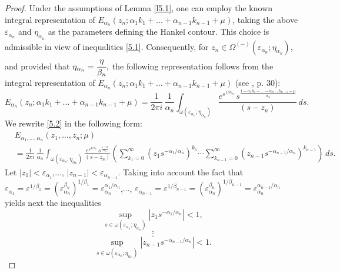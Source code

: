 \documentclass[12pt, reqno]{amsart}
\theoremstyle{definition}
\theoremstyle{remark}
\numberwithin{equation}{section}
\begin{document}
\begin{proof}
Under the assumptions of Lemma \ref{l5.1}, one can employ the known integral representation of
$E_{\alpha_n}\left(z_n;\alpha_1 k_1+...+\alpha_{n-1}k_{n-1}+\mu\right)$, taking the above
$\varepsilon_{\alpha_n}$ and $\eta_{\alpha_n}$ as the parameters defining the Hankel contour.
This choice is admissible in view of inequalities \eqref{5.1}. Consequently, for
$
z_n\in\Omega^{(-)}(\varepsilon_{\alpha_n};\eta_{\alpha_n}),
$
and provided that
$
\eta_{\alpha_n}=\cfrac{\eta}{\beta_n},
$
the following representation follows from the integral representation of
$E_{\alpha_n}(z_n;\alpha_1k_1+\dots+\alpha_{n-1}k_{n-1}+\mu)$ (see \cite{Podlubny}, p. 30):
$$
E_{\alpha_n}(z_n;\alpha_1k_1+\dots+\alpha_{n-1}k_{n-1}+\mu)
=
\frac{1}{2\pi i}\,
\frac{1}{\alpha_n}
\int_{\omega(\varepsilon_{\alpha_n};\eta_{\alpha_n})}
\frac{
e^{s^{1/\alpha_n}}
\,s^{\frac{1-\alpha_1 k_1-\dots -\alpha_{n-1}k_{n-1}-\mu}{\alpha_n}}
}
{
(s-z_n)
}
\,ds.
$$
We rewrite \eqref{5.2} in the following form:
\begin{equation}\label{5.3}
\begin{aligned}
&E_{\alpha_1,\dots,\alpha_n}(z_1,\dots,z_n;\mu)\\
&=\frac{1}{2\pi i}\,
\frac{1}{\alpha_n}
\int_{\omega(\varepsilon_{\alpha_n};\eta_{\alpha_n})}
\frac{
e^{s^{1/\alpha_n}}
\,s^{\frac{1-\mu}{\alpha_n}}
}
{
(s-z_n)
}\left(\sum_{k_1=0}^{\infty}\left(z_1s^{-\alpha_1/\alpha_n}\right)^{k_1}\cdots\sum_{k_{n-1}=0}^{\infty}\left(z_{n-1}s^{-\alpha_{n-1}/\alpha_n}\right)^{k_{n-1}}\right)
\,ds.
\end{aligned}\end{equation}
Let $|z_1|<\varepsilon_{\alpha_1}$,$\dots$, $|z_{n-1}|<\varepsilon_{\alpha_{n-1}}$. Taking into account the fact that $\varepsilon_{\alpha_1}=\varepsilon^{1/\beta_1}=\left(\varepsilon_{\alpha_n}^{\beta_n}\right)^{1/\beta_1}=\varepsilon_{\alpha_n}^{\alpha_1/\alpha_n}$,$\dots$, $\varepsilon_{\alpha_{n-1}}=\varepsilon^{1/\beta_{n-1}}=\left(\varepsilon_{\alpha_n}^{\beta_{n}}\right)^{1/\beta_{n-1}}=\varepsilon_{\alpha_n}^{\alpha_{n-1}/\alpha_n}$ yields next the inequalities
\begin{equation}\label{5.4}
\sup_{s\in\omega(\varepsilon_{\alpha_n};\eta_{\alpha_n})}
\left|z_1s^{-\alpha_1/\alpha_n}\right|<1,
\end{equation}
$$\vdots$$
 \begin{equation}\label{5.5}
\sup_{s\in\omega(\varepsilon_{\alpha_n};\eta_{\alpha_n})}
\left|z_{n-1}s^{-\alpha_{n-1}/\alpha_n}\right|<1.
\end{equation}


\end{proof}
\end{document}
